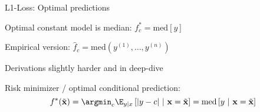 \documentclass[11pt,compress,t,notes=noshow, xcolor=table]{beamer}
\begin{document}
\begin{framei}[sep=L]{L1-Loss: Optimal predictions}

\item Optimal constant model is median: 
$f_{c}^{\ast} = \text{med} [y]$

\item Empirical version: $\hat{f}_c = \text{med}(y^{(1)}, \ldots, y^{(n)}) $  

\item Derivations slightly harder and in deep-dive

\item Risk minimizer / optimal conditional prediction:
$$f^{\ast}(\xtil) = \argmin_c \E_{y|x}\left[|y - c| ~|~ \xv = \xtil\right]= \text{med} \left[y ~|~ \xv = \xtil \right]
$$

\end{framei}



\endlecture
\end{document}
